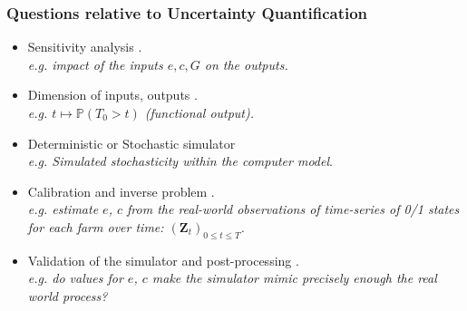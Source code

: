 \documentclass[nopagenumber,9pt]{beamer}
\renewcommand{\P}{\mathbb{P}}
\newcommand{\bZ}{\mathbf{Z}}
\begin{document}
	\begin{frame}
	 \frametitle{Questions relative to Uncertainty Quantification}

	 \begin{itemize}
	  \item Sensitivity analysis \cite{barbillon2015network,ferrer,lecarpentier2019walter}.\\
	   \textit{e.g. impact of the inputs $e,c,G$ on the outputs.}
	   \smallskip

	  \item Dimension of inputs, outputs \cite{ferrer}.\\
	  \textit{e.g. $t\mapsto\P(T_0> t)$ (functional output).}

	  	   \smallskip

	  \item Deterministic or Stochastic simulator \cite{stosim}\\
	  \textit{e.g. Simulated stochasticity within the computer model}.

	  	   \smallskip

	  \item Calibration and inverse problem \cite{barbillondamblin,metamodmix,carmassiPV}.\\
	  \textit{e.g. estimate $e$, $c$ from the real-world observations of time-series of 0/1 states for each farm over time: $(\bZ_t)_{0\le t\le T}$.}
	   \smallskip


	  \item Validation of the simulator and post-processing \cite{damblin2016bayesian,kaniav,courbariaux2017water,courbariaux2019post}.\\
	  \textit{e.g. do values for $e$, $c$ make the simulator mimic precisely enough the real world process?}
	 \end{itemize}



	\end{frame}



\end{document}
